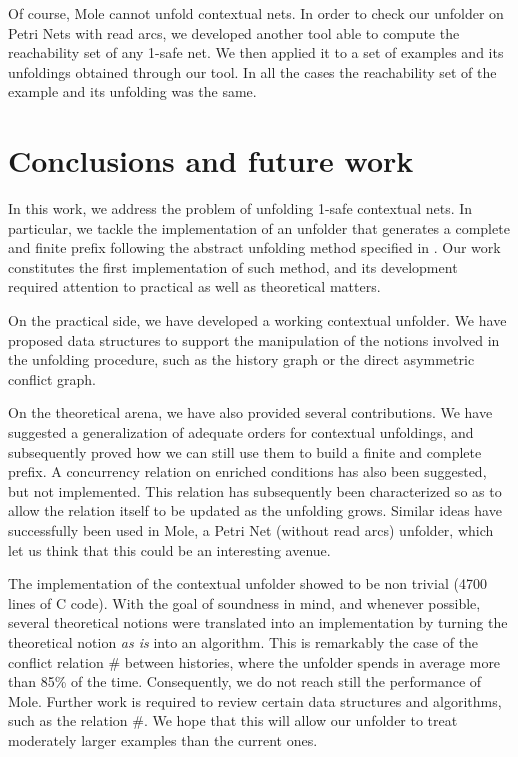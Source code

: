 \documentclass[11pt,a4paper]{article}
\newcommand{\confl}{\ensuremath{\mathord{\#}}}
\begin{document}
Of course, Mole cannot unfold contextual nets.  In order to check our unfolder
on Petri Nets with read arcs, we developed another tool able to compute the
reachability set of any 1-safe net.  We then applied it to a set of examples
and its unfoldings obtained through our tool.  In all the cases the
reachability set of the example and its unfolding was the same.


\section{Conclusions and future work}
\label{sec:conclusions}

In this work, we address the problem of unfolding 1-safe contextual nets.  In
particular, we tackle the implementation of an unfolder that generates a
complete and finite prefix following the abstract unfolding method specified in
.  Our work constitutes the first implementation of such method,
and its development required attention to practical as well as theoretical
matters.

On the practical side, we have developed a working contextual unfolder.  We
have proposed data structures to support the manipulation of the notions
involved in the unfolding procedure, such as the history graph or the direct
asymmetric conflict graph.

On the theoretical arena, we have also provided several contributions.  We have
suggested a generalization of adequate orders for contextual unfoldings, and
subsequently proved how we can still use them to build a finite and complete
prefix.  A concurrency relation on enriched conditions has also been suggested,
but not implemented.  This relation has subsequently been characterized so as
to allow the relation itself to be updated as the unfolding grows.  Similar
ideas have successfully been used in Mole, a Petri Net (without read arcs)
unfolder, which let us think that this could be an interesting avenue.

The implementation of the contextual unfolder showed to be non trivial (4700
lines of C code).  With the goal of soundness in mind, and whenever possible,
several theoretical notions were translated into an implementation by turning
the theoretical notion \emph{as is} into an algorithm.  This is remarkably the
case of the conflict relation $\confl$ between histories, where the unfolder
spends in average more than 85\% of the time.  Consequently, we do not reach
still the performance of Mole.  Further work is required to review certain data
structures and algorithms, such as the relation $\confl$.  We hope that this
will allow our unfolder to treat moderately larger examples than the current
ones.
\end{document}
